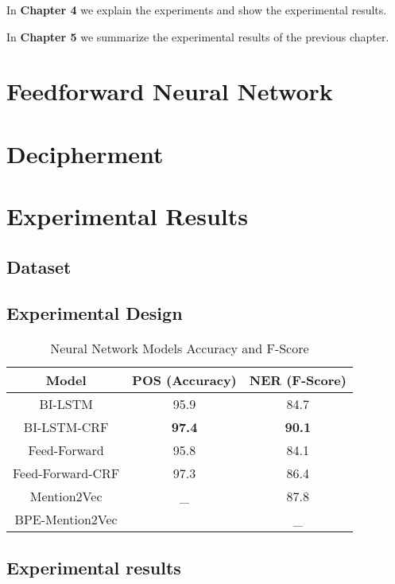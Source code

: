 \documentclass{sfuthesis}
\begin{document}
In \textbf{Chapter 4} we explain the experiments and show the experimental results.

In \textbf{Chapter 5} we summarize the experimental results of the previous chapter.

\chapter{Feedforward Neural Network}

\chapter{Decipherment}


\chapter{Experimental Results}
\label{ch:Experiment}
\section{Dataset}


\section{Experimental Design}
\begin{table}[]
\centering
\caption{Neural Network Models Accuracy and F-Score}
\label{my-label}
\begin{tabular}{|c|c|c|}
\hline
Model         & POS (Accuracy)  & NER (F-Score)       \\ \hline
BI-LSTM  & 95.9     & 84.7                             \\ \hline
BI-LSTM-CRF & \textbf{97.4} & \textbf{90.1}                             \\ \hline
Feed-Forward    & 95.8          &   84.1                                         \\ \hline
Feed-Forward-CRF & 97.3     & 86.4                          \\ \hline
Mention2Vec & _    & 87.8                         \\ \hline
BPE-Mention2Vec  &     &  _   \\ \hline   
\end{tabular}
\end{table}


\section{Experimental results}
\end{document}
